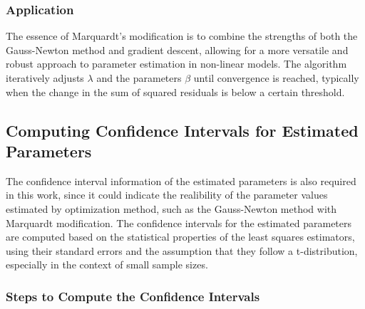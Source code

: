 \documentclass[12pt]{article} %
\begin{document}
\subsubsection{Application}
The essence of Marquardt's modification is to combine the strengths of both the Gauss-Newton method and gradient descent, allowing for a more versatile and robust approach to parameter estimation in non-linear models. The algorithm iteratively adjusts $\lambda$ and the parameters $\beta$ until convergence is reached, typically when the change in the sum of squared residuals is below a certain threshold.

\subsection{Computing Confidence Intervals for Estimated Parameters}

The confidence interval information of the estimated parameters is also required in this work, since it could indicate the realibility of the parameter values estimated by optimization method, such as the Gauss-Newton method with Marquardt modification. The confidence intervals for the estimated parameters are computed based on the statistical properties of the least squares estimators, using their standard errors and the assumption that they follow a t-distribution, especially in the context of small sample sizes.

\subsubsection{Steps to Compute the Confidence Intervals}
\end{document}
